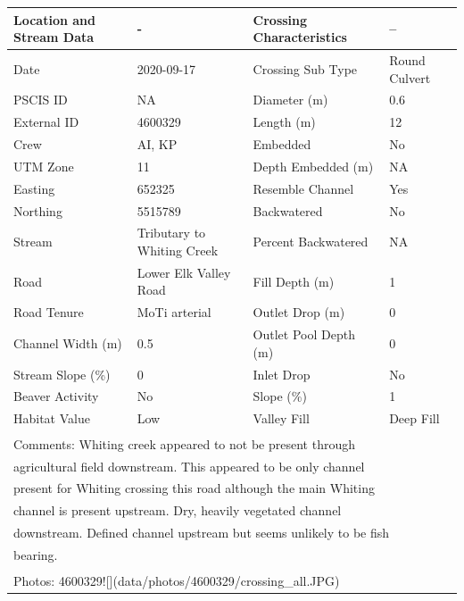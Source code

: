 \documentclass[
]{book}
\begin{document}
\begin{tabular}{llll}
\toprule
Location and Stream Data & - & Crossing Characteristics & --\\
\midrule
Date & 2020-09-17 & Crossing Sub Type & Round Culvert\\
PSCIS ID & NA & Diameter (m) & 0.6\\
External ID & 4600329 & Length (m) & 12\\
Crew & AI, KP & Embedded & No\\
UTM Zone & 11 & Depth Embedded (m) & NA\\
\addlinespace
Easting & 652325 & Resemble Channel & Yes\\
Northing & 5515789 & Backwatered & No\\
Stream & Tributary to Whiting Creek & Percent Backwatered & NA\\
Road & Lower Elk Valley Road & Fill Depth (m) & 1\\
Road Tenure & MoTi arterial & Outlet Drop (m) & 0\\
\addlinespace
Channel Width (m) & 0.5 & Outlet Pool Depth (m) & 0\\
Stream Slope (\%) & 0 & Inlet Drop & No\\
Beaver Activity & No & Slope (\%) & 1\\
Habitat Value & Low & Valley Fill & Deep Fill\\
\bottomrule
\multicolumn{4}{l}{\textsuperscript{} Comments: Whiting creek appeared to not be present through}\\
\multicolumn{4}{l}{agricultural field downstream. This appeared to be only channel}\\
\multicolumn{4}{l}{present for Whiting crossing this road although the main Whiting}\\
\multicolumn{4}{l}{channel is present upstream. Dry, heavily vegetated channel}\\
\multicolumn{4}{l}{downstream. Defined channel upstream but seems unlikely to be fish}\\
\multicolumn{4}{l}{bearing.}\\
\multicolumn{4}{l}{\textsuperscript{} Photos: 4600329![](data/photos/4600329/crossing\_all.JPG)}\\
\end{tabular}
\end{document}

